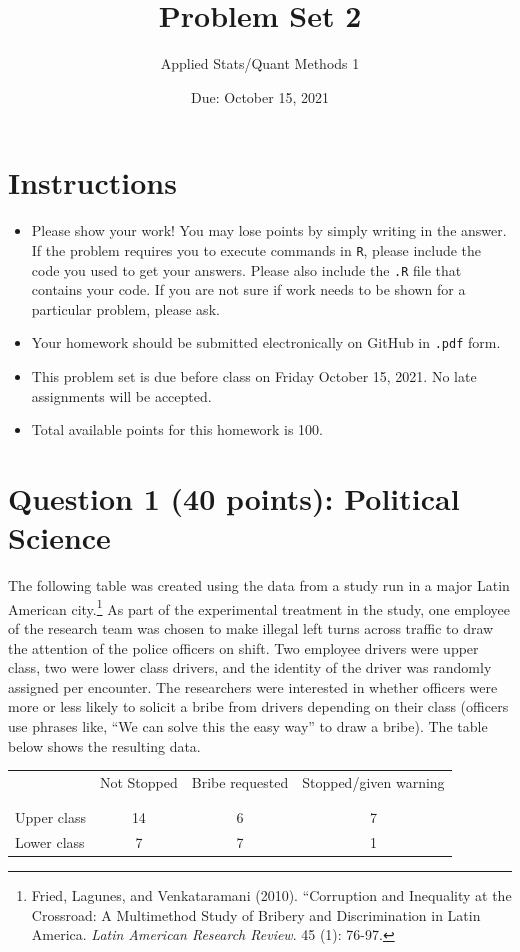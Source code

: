 \documentclass[12pt,letterpaper]{article}
\title{Problem Set 2}
\date{Due: October 15, 2021}
\author{Applied Stats/Quant Methods 1}
\begin{document}
	\maketitle
	\section*{Instructions}
	\begin{itemize}
		\item Please show your work! You may lose points by simply writing in the answer. If the problem requires you to execute commands in \texttt{R}, please include the code you used to get your answers. Please also include the \texttt{.R} file that contains your code. If you are not sure if work needs to be shown for a particular problem, please ask.
		\item Your homework should be submitted electronically on GitHub in \texttt{.pdf} form.
		\item This problem set is due before class on Friday October 15, 2021. No late assignments will be accepted.
		\item Total available points for this homework is 100.
	\end{itemize}
	
	
	\vspace{.5cm}
	\section*{Question 1 (40 points): Political Science}
	\vspace{.25cm}
	The following table was created using the data from a study run in a major Latin American city.\footnote{Fried, Lagunes, and Venkataramani (2010). ``Corruption and Inequality at the Crossroad: A Multimethod Study of Bribery and Discrimination in Latin America. \textit{Latin American Research Review}. 45 (1): 76-97.} As part of the experimental treatment in the study, one employee of the research team was chosen to make illegal left turns across traffic to draw the attention of the police officers on shift. Two employee drivers were upper class, two were lower class drivers, and the identity of the driver was randomly assigned per encounter. The researchers were interested in whether officers were more or less likely to solicit a bribe from drivers depending on their class (officers use phrases like, ``We can solve this the easy way'' to draw a bribe). The table below shows the resulting data.
	
	\newpage
	\begin{table}[h!]
		\centering
		\begin{tabular}{l | c c c }
			& Not Stopped & Bribe requested & Stopped/given warning \\
			\\[-1.8ex] 
			\hline \\[-1.8ex]
			Upper class & 14 & 6 & 7 \\
			Lower class & 7 & 7 & 1 \\
			\hline
		\end{tabular}
	\end{table}
	
\end{document}
